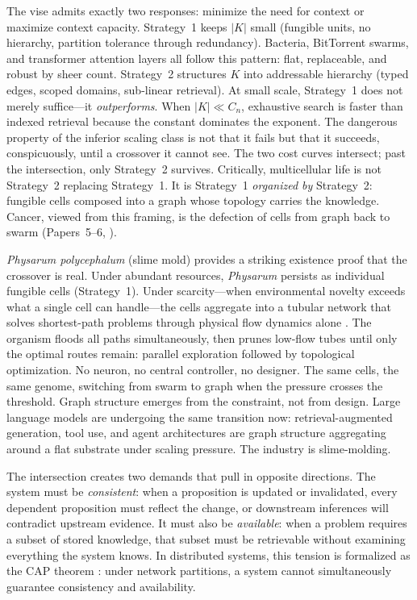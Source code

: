 \documentclass[11pt]{article}
\theoremstyle{definition}
\begin{document}
The vise admits exactly two responses: minimize the need for context
or maximize context capacity. Strategy~1 keeps $|K|$ small (fungible
units, no hierarchy, partition tolerance through redundancy). Bacteria,
BitTorrent swarms, and transformer attention layers all follow this
pattern: flat, replaceable, and robust by sheer count. Strategy~2
structures $K$ into addressable hierarchy (typed edges, scoped
domains, sub-linear retrieval). At small scale, Strategy~1 does not merely
suffice---it \emph{outperforms}. When $|K| \ll C_n$, exhaustive search
is faster than indexed retrieval because the constant dominates the
exponent. The dangerous property of the inferior scaling class is not
that it fails but that it succeeds, conspicuously, until a crossover it
cannot see. The two cost curves intersect; past the intersection, only
Strategy~2 survives. Critically, multicellular life is not Strategy~2 replacing
Strategy~1. It is Strategy~1 \emph{organized by} Strategy~2: fungible
cells composed into a graph whose topology carries the knowledge.
Cancer, viewed from this framing, is the defection of cells from graph
back to swarm (Papers~5--6, \cite{McCarthy2026e, McCarthy2026f}).

\emph{Physarum polycephalum} (slime mold) provides a striking
existence proof that the crossover is real. Under abundant resources,
\emph{Physarum} persists as individual fungible cells (Strategy~1).
Under scarcity---when environmental novelty exceeds what a single cell
can handle---the cells aggregate into a tubular network that solves
shortest-path problems through physical flow dynamics alone
\cite{Nakagaki2000}. The organism floods all paths simultaneously,
then prunes low-flow tubes until only the optimal routes remain:
parallel exploration followed by topological optimization. No neuron,
no central controller, no designer. The same cells, the same genome,
switching from swarm to graph when the pressure crosses the threshold.
Graph structure emerges from the constraint, not from design.
Large language models are undergoing the same transition now:
retrieval-augmented generation, tool use, and agent architectures are
graph structure aggregating around a flat substrate under scaling
pressure. The industry is slime-molding.

The intersection creates two demands that pull in opposite
directions. The system must be \emph{consistent}: when a proposition is
updated or invalidated, every dependent proposition must reflect the
change, or downstream inferences will contradict upstream evidence.
It must also be \emph{available}: when a problem requires a subset of
stored knowledge, that subset must be retrievable without examining
everything the system knows. In distributed systems, this tension is
formalized as the CAP theorem \cite{Brewer2000, Gilbert2002}: under
network partitions, a system cannot simultaneously guarantee
consistency and availability.
\end{document}

